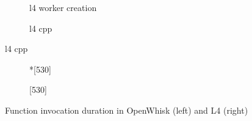 \documentclass[a4paper]{article}
\begin{document}
\begin{figure}
  \begin{subfigure}[t]{0.45\linewidth}
    \centering
    \caption{l4 worker creation}
  \end{subfigure}
  \hfill
  \begin{subfigure}[t]{0.45\linewidth}
    \centering
    \caption{l4 cpp}
  \end{subfigure}
\end{figure}
\begin{figure}
  \begin{subfigure}[t]{0.45\linewidth}
    *[530]
  \end{subfigure}
  \hfill
  \begin{subfigure}[t]{0.45\linewidth}
    [530]
  \end{subfigure}
  \caption{Function invocation duration in OpenWhisk (left) and L4 (right)}
\end{figure}
\end{document}
